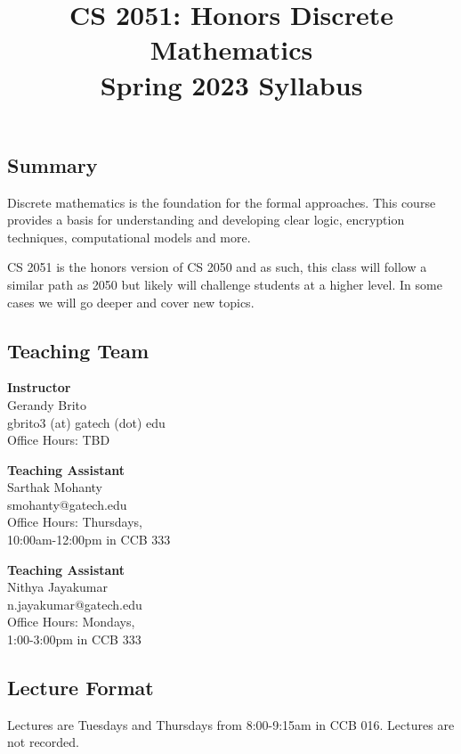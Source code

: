 \documentclass{article}
\title{\vspace{-1cm}CS 2051: Honors Discrete Mathematics \\Spring 2023 Syllabus\vspace{-1cm}}
\author{}
\date{}
\begin{document}
\maketitle

\subsection*{Summary}
    Discrete mathematics is the foundation for the formal approaches. This course provides a basis for understanding and developing clear logic, encryption techniques, computational models and more.
    
    \vspace{3mm}
    CS 2051 is the honors version of CS 2050 and as such, this class will follow a similar path as 2050 but likely will challenge students at a higher level. In some cases we will go deeper and cover new topics.

\subsection*{Teaching Team}
    \begin{multicols}{3}
        \textbf{Instructor} \\
        \noindent Gerandy Brito \\
        gbrito3 (at) gatech (dot) edu \\
        Office Hours: TBD

        \columnbreak

        \textbf{Teaching Assistant} \\
        Sarthak Mohanty \\
        smohanty@gatech.edu \\
        Office Hours: Thursdays, \\
        10:00am-12:00pm in CCB 333

        \columnbreak
        
        \textbf{Teaching Assistant} \\
        Nithya Jayakumar \\
        n.jayakumar@gatech.edu \\
        Office Hours: Mondays, \\
        1:00-3:00pm in CCB 333
    \end{multicols}

\subsection*{Lecture Format}
    Lectures are Tuesdays and Thursdays from 8:00-9:15am in CCB 016. Lectures are not recorded.
    
\end{document}
